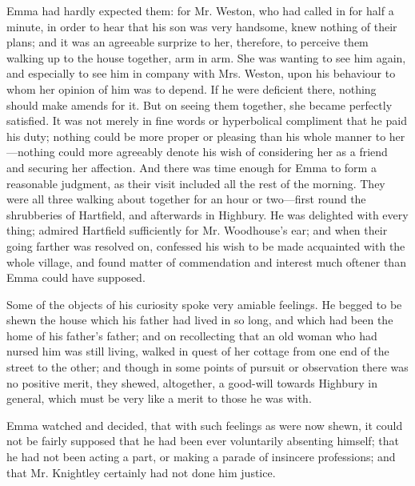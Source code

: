 Emma had hardly expected them: for Mr. Weston, who had called in for half a minute, in order to hear that his son was very handsome, knew nothing of their plans; and it was an agreeable surprize to her, therefore, to perceive them walking up to the house together, arm in arm. She was wanting to see him again, and especially to see him in company with Mrs. Weston, upon his behaviour to whom her opinion of him was to depend. If he were deficient there, nothing should make amends for it. But on seeing them together, she became perfectly satisfied. It was not merely in fine words or hyperbolical compliment that he paid his duty; nothing could be more proper or pleasing than his whole manner to her---nothing could more agreeably denote his wish of considering her as a friend and securing her affection. And there was time enough for Emma to form a reasonable judgment, as their visit included all the rest of the morning. They were all three walking about together for an hour or two---first round the shrubberies of Hartfield, and afterwards in Highbury. He was delighted with every thing; admired Hartfield sufficiently for Mr. Woodhouse's ear; and when their going farther was resolved on, confessed his wish to be made acquainted with the whole village, and found matter of commendation and interest much oftener than Emma could have supposed.

Some of the objects of his curiosity spoke very amiable feelings. He begged to be shewn the house which his father had lived in so long, and which had been the home of his father's father; and on recollecting that an old woman who had nursed him was still living, walked in quest of her cottage from one end of the street to the other; and though in some points of pursuit or observation there was no positive merit, they shewed, altogether, a good-will towards Highbury in general, which must be very like a merit to those he was with.

Emma watched and decided, that with such feelings as were now shewn, it could not be fairly supposed that he had been ever voluntarily absenting himself; that he had not been acting a part, or making a parade of insincere professions; and that Mr. Knightley certainly had not done him justice.

